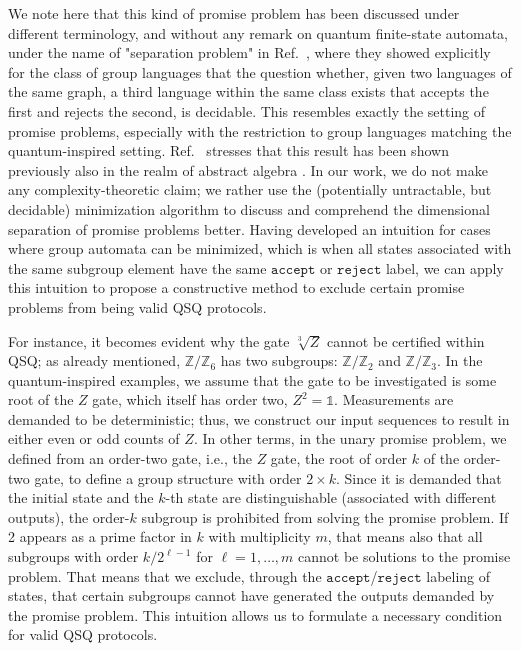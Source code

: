 \documentclass[../main.tex]{subfiles}
\begin{document}
We note here that this kind of promise problem has been discussed under different terminology, and without any remark on quantum finite-state automata, under the name of "separation problem" in Ref.~\cite{place2022group}, where they showed explicitly for the class of group languages that the question whether, given two languages of the same graph, a third language within the same class exists that accepts the first and rejects the second, is decidable. This resembles exactly the setting of promise problems, especially with the restriction to group languages matching the quantum-inspired setting. Ref.~\cite{place2022group} stresses that this result has been shown previously also in the realm of abstract algebra \cite{ash1991inevitable}. In our work, we do not make any complexity-theoretic claim; we rather use the (potentially untractable, but decidable) minimization algorithm to discuss and comprehend the dimensional separation of promise problems better. Having developed an intuition for cases where group automata can be minimized, which is when all states associated with the same subgroup element have the same $\mathtt{accept}$ or $\mathtt{reject}$  label, we can apply this intuition to propose a constructive method to exclude certain promise problems from being valid QSQ protocols.

For instance, it becomes evident why the gate $\sqrt[3]{Z}$ cannot be certified within QSQ; as already mentioned, $\mathbb{Z}/\mathbb{Z}_6$ has two subgroups: $\mathbb{Z}/\mathbb{Z}_2$ and $\mathbb{Z}/\mathbb{Z}_3$. In the quantum-inspired examples, we assume that the gate to be investigated is some root of the $Z$ gate, which itself has order two, $Z^2 = \mathds{1}$. Measurements are demanded to be deterministic; thus, we construct our input sequences to result in either even or odd counts of $Z$. In other terms, in the unary promise problem, we defined from an order-two gate, i.e., the $Z$ gate, the root of order $k$ of the order-two gate, to define a group structure with order $2 \times k$. Since it is demanded that the initial state and the $k$-th state are distinguishable (associated with different outputs), the order-$k$ subgroup is prohibited from solving the promise problem. If 2 appears as a prime factor in $k$ with multiplicity $m$, that means also that all subgroups with order $k / 2^{\ell-1}$ for $\ell = 1, \ldots, m$ cannot be solutions to the promise problem.
That means that we exclude, through the $\mathtt{accept}$/$\mathtt{reject}$  labeling of states, that certain subgroups cannot have generated the outputs demanded by the promise problem. This intuition allows us to formulate a necessary condition for valid QSQ protocols.
\end{document}
